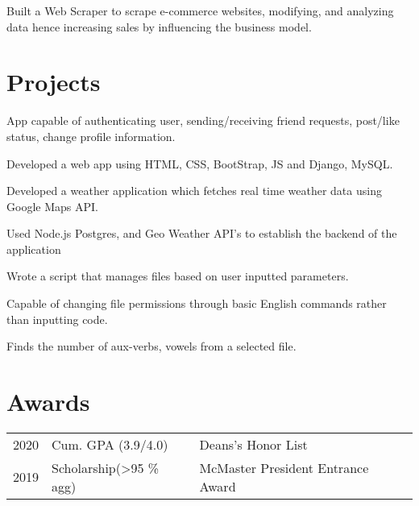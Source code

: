 \documentclass[]{deedy-resume-openfont}
\begin{document}
\begin{minipage}[t]{0.66\textwidth}
\begin{tightemize}
\item Built a Web Scraper to scrape e-commerce websites, modifying, and analyzing data hence increasing sales by influencing the business model.
\end{tightemize}
\sectionsep


\section{\color{red}Projects}

\begin{tightemize}
\item App capable of authenticating user, sending/receiving friend requests, post/like status, change profile information.
\item Developed a web app using HTML, CSS, BootStrap, JS and Django, MySQL.
\end{tightemize}
\sectionsep


\begin{tightemize}
\item Developed a weather application which fetches real time weather data using Google Maps API.
\item Used Node.js Postgres, and Geo Weather API’s to establish the backend of the application	
\end{tightemize}
\sectionsep
{}

\begin{tightemize}
\item  Wrote a script that manages files based on user inputted parameters.
\item Capable of changing file permissions through basic English commands
rather than inputting code.
\item Finds the number of aux-verbs, vowels from a selected file.

\end{tightemize}
\sectionsep

\section{\color{red} Awards} 
\begin{tabular}{rll}
2020         & Cum. GPA (3.9/4.0)       & Deans's Honor List\\
2019	     & Scholarship(>95 \% agg)  & McMaster President Entrance Award\\
\end{tabular}
\sectionsep



\end{minipage} 
\end{document}
